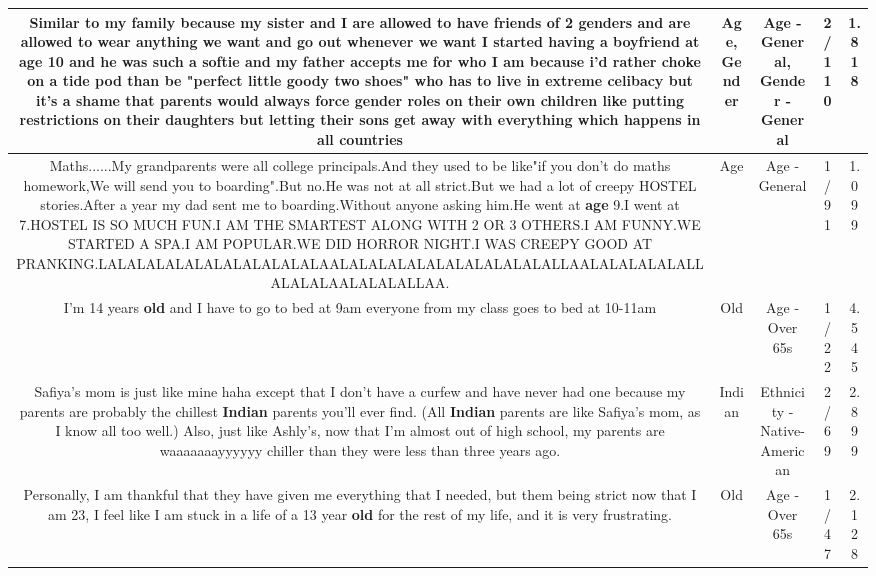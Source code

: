 \documentclass[11pt]{article}
\newlength\mylength
\begin{document}
\begin{center}
\begin{longtable}{|C{.65\mylength}|C{.30\mylength}|C{.12\mylength}|C{.12\mylength}|C{.12\mylength}|}
  \small Similar to my family because my sister and I are allowed to have friends of 2 genders and are allowed to wear anything we want and go out whenever we want I started having a boyfriend at \textbf{age} 10 and he was such a softie and my father accepts me for who I am because i'd rather choke on a tide pod than be "perfect little goody two shoes" who has to live in extreme celibacy but it's a shame that parents would always force \textbf{gender} roles on their own children like putting restrictions on their daughters but letting their sons get away with everything which happens in all countries\normalsize   & Age, Gender & Age - General, Gender - General & 2/110 & 1.818 \\  \hline
  \small Maths......My grandparents were all college principals.And they used to be like"if you don't do maths homework,We will send you to boarding".But no.He was not at all strict.But we had a lot of creepy HOSTEL stories.After a year my dad sent me to boarding.Without anyone asking him.He went at \textbf{age} 9.I went at 7.HOSTEL IS SO MUCH FUN.I AM THE SMARTEST ALONG WITH 2 OR 3 OTHERS.I AM FUNNY.WE STARTED A SPA.I AM POPULAR.WE DID HORROR NIGHT.I WAS CREEPY GOOD AT PRANKING.LALALALALALALALALALALALAALALALALALALALALALALALALLAALALALALALALLALALALAALALALALLAA.\normalsize   & Age & Age - General & 1/91 & 1.099 \\  \hline
  \small I'm 14 years \textbf{old} and I have to go to bed at 9am everyone from my class goes to bed at 10-11am\normalsize   & Old & Age - Over 65s & 1/22 & 4.545 \\  \hline
  \small Safiya's mom is just like mine haha except that I don't have a curfew and have never had one because my parents are probably the chillest \textbf{Indian} parents you'll ever find. (All \textbf{Indian} parents are like Safiya's mom, as I know all too well.) Also, just like Ashly's, now that I'm almost out of high school, my parents are waaaaaaayyyyyy chiller than they were less than three years ago.\normalsize   & Indian & Ethnicity - Native-American & 2/69 & 2.899 \\  \hline
  \small Personally, I am thankful that they have given me everything that I needed, but them being strict now that I am 23, I feel like I am stuck in a life of a 13 year \textbf{old} for the rest of my life, and it is very frustrating.\normalsize   & Old & Age - Over 65s & 1/47 & 2.128 \\  \hline

\end{longtable}
\end{center}
\end{document}
